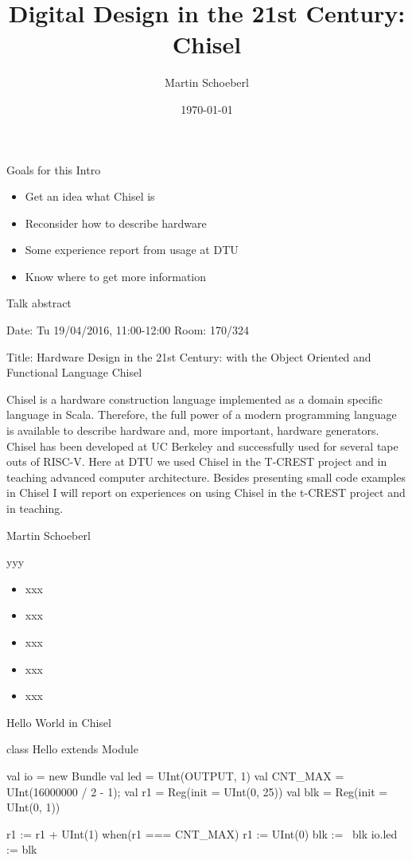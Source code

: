 \documentclass[xcolor=pdflatex,dvipsnames,table]{beamer}
\title{Digital Design in the 21st Century: Chisel}
\author{Martin Schoeberl}
\date{\today}
\institute{DTU Compute}
\begin{document}
\begin{frame}
\titlepage
\end{frame}

\begin{frame}{Goals for this Intro}
\begin{itemize}
\item Get an idea what Chisel is
\item Reconsider how to describe hardware
\item Some experience report from usage at DTU
\item Know where to get more information
\end{itemize}
\end{frame}

\begin{frame}{Talk abstract}

Date: Tu 19/04/2016, 11:00-12:00
Room: 170/324

Title: Hardware Design in the 21st Century: with the Object Oriented
and Functional Language Chisel

Chisel is a hardware construction language implemented as a
domain specific language in Scala. Therefore, the full power of
a modern programming language is available to describe hardware
and, more important, hardware generators. Chisel has been developed
at UC Berkeley and successfully used for several tape outs of RISC-V.
Here at DTU we used Chisel in the T-CREST project and in teaching
advanced computer architecture. Besides presenting small code
examples in Chisel I will report on experiences on using Chisel in
the t-CREST project and in teaching.

Martin Schoeberl
\end{frame}

\begin{frame}{yyy}
\begin{itemize}
\item xxx
\item xxx
\item xxx
\item xxx
\item xxx
\end{itemize}
\end{frame}

\begin{frame}[fragile]{Hello World in Chisel}
\begin{chisel}
class Hello extends Module {
  val io = new Bundle {
    val led = UInt(OUTPUT, 1)
  }
  val CNT_MAX = UInt(16000000 / 2 - 1);
  val r1 = Reg(init = UInt(0, 25))
  val blk = Reg(init = UInt(0, 1))

  r1 := r1 + UInt(1)
  when(r1 === CNT_MAX) {
    r1 := UInt(0)
    blk := ~blk
  }
  io.led := blk
}
\end{chisel}
\end{frame}
\end{document}

